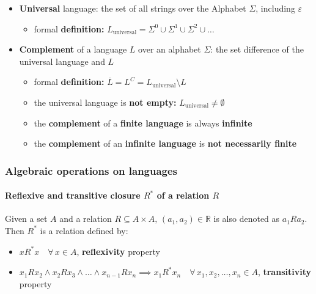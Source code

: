 \documentclass[english]{article}
\begin{document}
\begin{itemize}
  \item \textbf{Universal} language: the set of all strings over the Alphabet \(\Sigma\), including \(\varepsilon\)
        \begin{itemize}
          \item formal \textbf{definition:} \(L_{\text{universal}} = \Sigma^0 \cup \Sigma^1 \cup \Sigma^2 \cup \ldots\)
        \end{itemize}
  \item \textbf{Complement} of a language \(L\) over an alphabet \(\Sigma\): the set difference of the universal language and \(L\)
        \begin{itemize}
          \item formal \textbf{definition:} \(\overline{L} = L^C = L_{\text{universal}} \setminus L\)
          \item the universal language is \textbf{not empty:} \(L_{\text{universal}} \neq \emptyset\)
          \item the \textbf{complement} of a \textbf{finite language} is always \textbf{infinite}
          \item the \textbf{complement} of an \textbf{infinite language} is \textbf{not necessarily finite}
        \end{itemize}
\end{itemize}

\subsubsection{Algebraic operations on languages}

\paragraph[Reflexive and transitive closure R* of relation R]{Reflexive and transitive closure \(R^\ast\) of a relation \(R\)}

Given a set \(A\) and a relation \(R \subseteq A \times A, \, (a_1, a_2) \in \mathbb{R}\) is also denoted as \(a_1 R a_2\).
Then \(R^\ast\) is a relation defined by:

\begin{itemize}
  \item \(x R^\ast x \quad \forall \, x \in A\), \textbf{reflexivity} property
  \item \(x_1 R x_2 \land x_2 R x_3 \land \ldots \land x_{n-1} R x_n \implies x_1 R^\ast x_n \quad \forall \, x_1, x_2, \ldots, x_n \in A\), \textbf{transitivity} property
\end{itemize}
\end{document}
